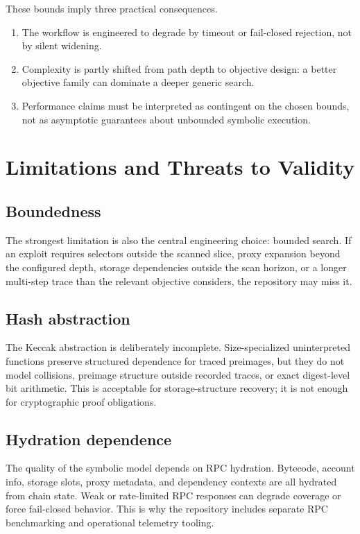 \documentclass[11pt]{article}
\numberwithin{equation}{section}
\theoremstyle{remark}
\begin{document}
These bounds imply three practical consequences.
\begin{enumerate}[leftmargin=1.5em]
  \item The workflow is engineered to degrade by timeout or fail-closed rejection, not by silent widening.
  \item Complexity is partly shifted from path depth to objective design: a better objective family can dominate a deeper generic search.
  \item Performance claims must be interpreted as contingent on the chosen bounds, not as asymptotic guarantees about unbounded symbolic execution.
\end{enumerate}

\section{Limitations and Threats to Validity}
\label{sec:limitations}

\subsection{Boundedness}

The strongest limitation is also the central engineering choice: bounded search. If an exploit requires selectors outside the scanned slice, proxy expansion beyond the configured depth, storage dependencies outside the scan horizon, or a longer multi-step trace than the relevant objective considers, the repository may miss it.

\subsection{Hash abstraction}

The Keccak abstraction is deliberately incomplete. Size-specialized uninterpreted functions preserve structured dependence for traced preimages, but they do not model collisions, preimage structure outside recorded traces, or exact digest-level bit arithmetic. This is acceptable for storage-structure recovery; it is not enough for cryptographic proof obligations.

\subsection{Hydration dependence}

The quality of the symbolic model depends on RPC hydration. Bytecode, account info, storage slots, proxy metadata, and dependency contexts are all hydrated from chain state. Weak or rate-limited RPC responses can degrade coverage or force fail-closed behavior. This is why the repository includes separate RPC benchmarking and operational telemetry tooling.
\end{document}
